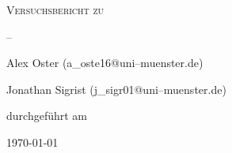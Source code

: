 
\makeatletter
\newcommand*{\protokollemailparse}[1]{%
	\@for\@tempa:=#1\do{%
		\normalsize\email{\@tempa}\\
	}%
}
\makeatother

\begin{titlepage}
	\centering
	{\scshape\LARGE Versuchsbericht zu \par}
	\vspace{1cm}
	{\scshape\huge \varNum {} --\varName\par}
	\vspace{2.5cm}
	{\LARGE \varGruppe\par}
	\vspace{0.5cm}
	{\large Alex Oster (a\_oste16@uni--muenster.de) \par}
	{\large Jonathan Sigrist (j\_sigr01@uni--muenster.de) \par}
	\vfill
	durchgeführt am \varDatum\par
	{\large \varBetreuer} 
	\vfill	
	{\large \today\par}
\end{titlepage}


\maketitle
